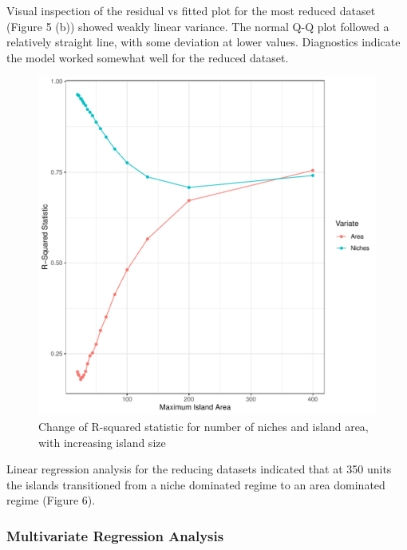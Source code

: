 \documentclass{article}
\begin{document}
\noindent Visual inspection of the residual vs fitted plot for the most reduced dataset (Figure 5 (b)) showed weakly linear variance. The normal Q-Q plot followed a relatively straight line, with some deviation at lower values.  Diagnostics indicate the model worked somewhat well for the reduced dataset. \bigskip

\begin{figure}[h!]
\centering
  \includegraphics[scale=0.5]{../../Results/Simulation/LMRSquared.pdf}
  \caption{Change of R-squared statistic for number of niches and island area, with increasing island size}
  \label{fig:R-Squared statistic}
\end{figure}

\noindent Linear regression analysis for the reducing datasets indicated that at 350 units the islands transitioned from a niche dominated regime to an area dominated regime (Figure 6). 

\subsubsection{Multivariate Regression Analysis}
\end{document}
